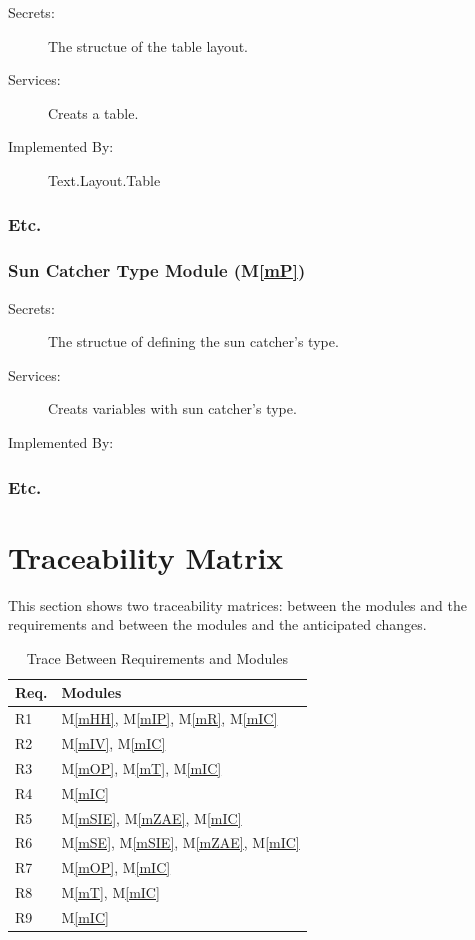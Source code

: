 \documentclass[12pt, titlepage]{article}
\newcommand{\mref}[1]{M\ref{#1}}
\begin{document}
\begin{description}
\item[Secrets:] The structue of the table layout.
\item[Services:] Creats a table.
\item[Implemented By:] Text.Layout.Table
\end{description}
\subsubsection{Etc.}

\subsubsection{Sun Catcher Type Module (\mref{mP})}

\begin{description}
\item[Secrets:] The structue of defining the sun catcher's type.
\item[Services:] Creats variables with sun catcher's type.
\item[Implemented By:] \progname
\end{description}
\subsubsection{Etc.}


\section{Traceability Matrix} \label{SecTM}

This section shows two traceability matrices: between the modules and the
requirements and between the modules and the anticipated changes.

\begin{table}[H]
\centering
\begin{tabular}{p{} p{}}
\toprule
\textbf{Req.} & \textbf{Modules}\\
\midrule
R1 & \mref{mHH}, \mref{mIP}, \mref{mR}, \mref{mIC}\\
R2 & \mref{mIV}, \mref{mIC}\\
R3 & \mref{mOP}, \mref{mT}, \mref{mIC}\\
R4 & \mref{mIC}\\
R5 & \mref{mSIE}, \mref{mZAE}, \mref{mIC}\\
R6 & \mref{mSE}, \mref{mSIE}, \mref{mZAE}, \mref{mIC}\\
R7 &\mref{mOP}, \mref{mIC}\\
R8 & \mref{mT}, \mref{mIC}\\
R9 & \mref{mIC}\\
\bottomrule
\end{tabular}
\caption{Trace Between Requirements and Modules}
\label{TblRT}
\end{table}
\end{document}
